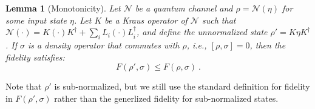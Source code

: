\documentclass[11pt,letterpaper]{article}
\newtheorem{lem}{Lemma}
\begin{document}
\begin{lem}[Monotonicity]\label{lem:monotonicity}
Let $\mathcal{N}$ be a quantum channel and $\rho = \mathcal{N}(\eta)$ for some input state $\eta$. Let $K$ be a Kraus operator of $\mathcal{N}$ such that $\mathcal{N}(\cdot) = K(\cdot)K^\dagger + \sum_{i} L_i (\cdot) L_i^\dagger$, and define the unnormalized state $\rho' = K \eta K^\dagger$. If $\sigma$ is a density operator that commutes with $\rho$, i.e., $[\rho, \sigma] = 0$, then the fidelity satisfies:
\begin{equation}
    F(\rho', \sigma)\leq F(\rho, \sigma) \ .
\end{equation}
\end{lem}
Note that $\rho'$ is sub-normalized, but we still use the standard definition for fidelity in $F(\rho', \sigma)$ rather than the generlized fidelity for sub-normalized states. 
\end{document}
